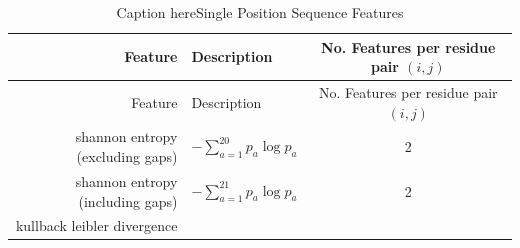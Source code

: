 \documentclass[11pt,a4paper,twoside]{book}
\theoremstyle{definition}
\theoremstyle{definition}
\theoremstyle{remark}
\begin{document}
\begin{longtable}[]{@{}rlc@{}}
\caption{\label{tab:single-position-features} Caption hereSingle Position
Sequence Features}\tabularnewline
\toprule
\begin{minipage}[b]{0.23\columnwidth}\raggedleft\strut
Feature\strut
\end{minipage} & \begin{minipage}[b]{0.50\columnwidth}\raggedright\strut
Description\strut
\end{minipage} & \begin{minipage}[b]{0.18\columnwidth}\centering\strut
No. Features per residue pair \((i, j)\)\strut
\end{minipage}\tabularnewline
\midrule
\endfirsthead
\toprule
\begin{minipage}[b]{0.23\columnwidth}\raggedleft\strut
Feature\strut
\end{minipage} & \begin{minipage}[b]{0.50\columnwidth}\raggedright\strut
Description\strut
\end{minipage} & \begin{minipage}[b]{0.18\columnwidth}\centering\strut
No. Features per residue pair \((i, j)\)\strut
\end{minipage}\tabularnewline
\midrule
\endhead
\begin{minipage}[t]{0.23\columnwidth}\raggedleft\strut
shannon entropy (excluding gaps)\strut
\end{minipage} & \begin{minipage}[t]{0.50\columnwidth}\raggedright\strut
\(- \sum_{a=1}^{20} p_a \log p_a\)\strut
\end{minipage} & \begin{minipage}[t]{0.18\columnwidth}\centering\strut
2\strut
\end{minipage}\tabularnewline
\begin{minipage}[t]{0.23\columnwidth}\raggedleft\strut
shannon entropy (including gaps)\strut
\end{minipage} & \begin{minipage}[t]{0.50\columnwidth}\raggedright\strut
\(- \sum_{a=1}^{21} p_a \log p_a\)\strut
\end{minipage} & \begin{minipage}[t]{0.18\columnwidth}\centering\strut
2\strut
\end{minipage}\tabularnewline
\begin{minipage}[t]{0.23\columnwidth}\raggedleft\strut
kullback leibler divergence\strut
\end{minipage} & \begin{minipage}[t]{0.50\columnwidth}\raggedright\strut

\end{minipage}
\end{longtable}
\end{document}
